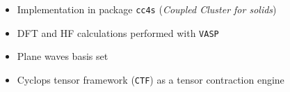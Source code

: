 \begin{itemize}
  \item
    Implementation in package \texttt{cc4s} (\textit{Coupled Cluster for
    solids})
  \item DFT and HF calculations performed with \texttt{VASP}
  \item Plane waves basis set
  \item Cyclops tensor framework (\texttt{CTF}) as a tensor contraction engine
\end{itemize}
